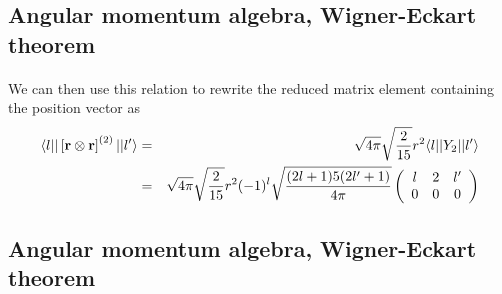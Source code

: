 \documentclass[%
twoside,                 %
final,                   %
10pt]{article}
\begin{document}
\subsection{Angular momentum algebra, Wigner-Eckart theorem}

\paragraph{}
We can then  use this relation to rewrite the reduced matrix element containing the 
position vector as  
\begin{eqnarray*}
\langle l \vert\vert\left[{\bf r} \otimes {\bf r} \right]^{(2)} \vert \vert l'\rangle
& = & 
\sqrt{4\pi}\sqrt{ \frac{2}{15}}r^2 \langle l \vert\vert Y_2 \vert \vert l'\rangle \\
& = &\sqrt{4\pi}\sqrt{ \frac{2}{15}}  r^2 (-1)^l
\sqrt{\frac{(2l+1)5(2l'+1)}{4\pi}}
\left(\begin{array}{ccc} l&2&l' \\ 0&0&0\end{array}\right)
\end{eqnarray*}



\subsection{Angular momentum algebra, Wigner-Eckart theorem}

\end{document}
